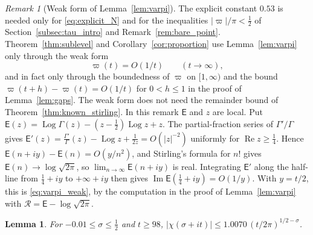 \documentclass[11pt,a4paper]{article}
\makeatletter
\numberwithin{equation}{section}
\DeclareRobustCommand{\CGref}[1]{\ref{#1}}
\DeclareRobustCommand{\CGeqref}[1]{\eqref{#1}}
\let\CG@origref\ref
\let\CG@origeqref\eqref
\newcommand{\CG@gettip}[1]{\@ifundefined{CGTip@#1}{#1}{\csname CGTip@#1\endcsname}}
\DeclareRobustCommand{\CGref}[1]{\pdftooltip{\CG@origref{#1}}{\CG@gettip{#1}}}
\DeclareRobustCommand{\CGeqref}[1]{\pdftooltip{\CG@origeqref{#1}}{\CG@gettip{#1}}}
\newtheorem{lemma}[theorem]{Lemma}
\theoremstyle{definition}
\theoremstyle{remark}
\newtheorem{remark}[theorem]{Remark}
\makeatother
\begin{document}
\begin{remark}[Weak form of Lemma~\ref{lem:varpi}]\label{rem:varpi_weak}
The explicit constant $0.53$ is needed only for \CGeqref{eq:explicit_N} and for the inequalities $|\varpi|/\pi<\frac12$ of Section~\CGref{subsec:tau_intro} and Remark~\CGref{rem:bare_point}. Theorem~\CGref{thm:sublevel} and Corollary~\CGref{cor:proportion} use Lemma~\CGref{lem:varpi} only through the weak form
\begin{equation}
\varpi(t)=O(1/t)\qquad(t\to\infty),
\label{eq:varpi_weak}
\end{equation}
and in fact only through the boundedness of $\varpi$ on $[1,\infty)$ and the bound $\varpi(t+h)-\varpi(t)=O(1/t)$ for $0<h\le1$ in the proof of Lemma~\CGref{lem:gaps}. The weak form does not need the remainder bound of Theorem~\CGref{thm:known_stirling}. In this remark $\mathsf E$ and $z$ are local. Put $\mathsf E(z)=\operatorname{Log}\Gamma(z)-(z-\frac12)\operatorname{Log}z+z$. The partial-fraction series of $\Gamma'/\Gamma$ gives $\mathsf E'(z)=\frac{\Gamma'}\Gamma(z)-\operatorname{Log}z+\frac1{2z}=O(|z|^{-2})$ uniformly for $\operatorname{Re}z\ge\frac14$. Hence $\mathsf E(n+iy)-\mathsf E(n)=O(y/n^2)$, and Stirling's formula for $n!$ gives $\mathsf E(n)\to\log\sqrt{2\pi}$, so $\lim_{n\to\infty}\mathsf E(n+iy)$ is real. Integrating $\mathsf E'$ along the half-line from $\frac14+iy$ to $+\infty+iy$ then gives $\operatorname{Im}\mathsf E(\frac14+iy)=O(1/y)$. With $y=t/2$, this is \CGeqref{eq:varpi_weak}, by the computation in the proof of Lemma~\CGref{lem:varpi} with $\mathcal R=\mathsf E-\log\sqrt{2\pi}$.
\end{remark}

\begin{lemma}\label{lem:chi}
For $-0.01\le\sigma\le\frac12$ and $t\ge98$, $|\chi(\sigma+it)|\le1.0070\,(t/2\pi)^{1/2-\sigma}$.
\end{lemma}
\end{document}

